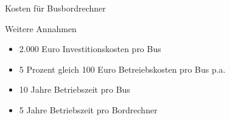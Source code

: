 
\begin{frame}{Kosten für Busbordrechner}
  \begin{block}{Weitere Annahmen}
  \begin{itemize}
  \item 2.000 Euro Investitionskosten pro Bus
  \item 5 Prozent gleich 100 Euro Betreiebskosten pro Bus p.a.
  \item 10 Jahre Betriebszeit pro Bus
  \item 5 Jahre Betriebszeit pro Bordrechner
  \end{itemize}
  \end{block}
\end{frame}

